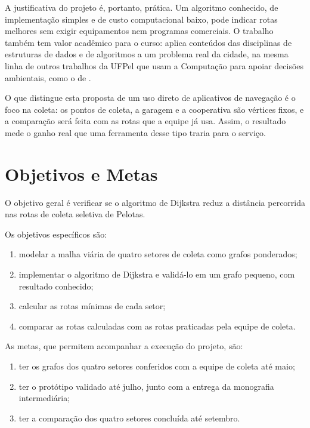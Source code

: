 \documentclass[tcc-proposta]{texufpel}
\begin{document}
A justificativa do projeto é, portanto, prática. Um algoritmo conhecido, de
implementação simples e de custo computacional baixo, pode indicar rotas
melhores sem exigir equipamentos nem programas comerciais. O trabalho também
tem valor acadêmico para o curso: aplica conteúdos das disciplinas de
estruturas de dados e de algoritmos a um problema real da cidade, na mesma
linha de outros trabalhos da UFPel que usam a Computação para apoiar decisões
ambientais, como o de \citet{Cruz:2015:FCS}.

O que distingue esta proposta de um uso direto de aplicativos de navegação é
o foco na coleta: os pontos de coleta, a garagem e a cooperativa são vértices
fixos, e a comparação será feita com as rotas que a equipe já usa. Assim, o
resultado mede o ganho real que uma ferramenta desse tipo traria para o
serviço.

\chapter{Objetivos e Metas}

O objetivo geral é verificar se o algoritmo de Dijkstra reduz a distância
percorrida nas rotas de coleta seletiva de Pelotas.

Os objetivos específicos são:

\begin{enumerate}
  \item modelar a malha viária de quatro setores de coleta como grafos
        ponderados;
  \item implementar o algoritmo de Dijkstra e validá-lo em um grafo pequeno,
        com resultado conhecido;
  \item calcular as rotas mínimas de cada setor;
  \item comparar as rotas calculadas com as rotas praticadas pela equipe de
        coleta.
\end{enumerate}

As metas, que permitem acompanhar a execução do projeto, são:

\begin{enumerate}
  \item ter os grafos dos quatro setores conferidos com a equipe de coleta até
        maio;
  \item ter o protótipo validado até julho, junto com a entrega da monografia
        intermediária;
  \item ter a comparação dos quatro setores concluída até setembro.
\end{enumerate}
\end{document}
